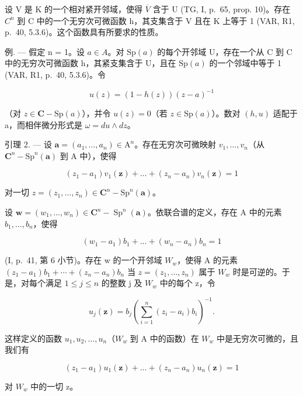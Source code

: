 设 V 是 K 的一个相对紧开邻域，使得 \(\overline{V}\) 含于 U (TG, I, p.~65, prop. 10)。存在 \(C^{n}\) 到 C 中的一个无穷次可微函数 h，其支集含于 V 且在 K 上等于 1 (VAR, R1, p.~40, 5.3.6)。这个函数具有所要求的性质。

例. --- 假定 n = 1。设 \(a \in A\)。对 \(\mathrm{Sp}(a)\) 的每个开邻域 U，存在一个从 C 到 C 中的无穷次可微函数 h，其紧支集含于 U，且在 \(\mathrm{Sp}(a)\) 的一个邻域中等于 1 (VAR, R1, p.~40, 5.3.6)。令

\[
u (z) = (1 - h (z)) (z - a) ^ {- 1}
\]

（对 \(z \in \mathbf{C} - \mathrm{Sp}(a)\)），并令 \(u(z) = 0\)（若 \(z \in \mathrm{Sp}(a)\)）。数对 \((h, u)\) 适配于 a，而相伴微分形式是 \(\omega = du \wedge dz\)。

引理 2. --- 设 \(\boldsymbol{a} = (a_{1},\ldots ,a_{n})\in \mathrm{A}^{n}\)。存在无穷次可微映射 \(v_{1},\ldots ,v_{n}\)（从 \(\mathbf{C}^n -\mathrm{Sp}^n (\boldsymbol {a})\) 到 A 中），使得

\[
(z _ {1} - a _ {1}) v _ {1} (\boldsymbol {z}) + \dots + (z _ {n} - a _ {n}) v _ {n} (\boldsymbol {z}) = 1
\]

对一切 \(z = (z_{1}, \ldots, z_{n}) \in \mathbf{C}^{n} - \mathrm{Sp}^{n}(\boldsymbol{a})\)。

设 \(\boldsymbol{w} = (w_{1}, \ldots, w_{n}) \in \mathbf{C}^{n} - \operatorname{Sp}^{n}(\boldsymbol{a})\)。依联合谱的定义，存在 A 中的元素 \(b_{1}, \ldots, b_{n}\)，使得

\[
(w _ {1} - a _ {1}) b _ {1} + \dots + (w _ {n} - a _ {n}) b _ {n} = 1
\]

(I, p.~41, 第 6 小节)。存在 w 的一个开邻域 \(W_{w}\)，使得 A 的元素 \((z_{1}-a_{1})b_{1}+\cdots+(z_{n}-a_{n})b_{n}\) 当 \(z=(z_{1},\ldots,z_{n})\) 属于 \(W_{w}\) 时是可逆的。于是，对每个满足 \(1\leqslant j\leqslant n\) 的整数 j 及 \(W_{w}\) 中的每个 z，令

\[
u _ {j} (\boldsymbol {z}) = b _ {j} \left(\sum_ {i = 1} ^ {n} (z _ {i} - a _ {i}) b _ {i}\right) ^ {- 1}.
\]

这样定义的函数 \(u_{1}, u_{2}, \ldots, u_{n}\)（\(W_{w}\) 到 A 中的函数）在 \(W_{w}\) 中是无穷次可微的，且我们有

\[
(z _ {1} - a _ {1}) u _ {1} (\boldsymbol {z}) + \dots + (z _ {n} - a _ {n}) u _ {n} (\boldsymbol {z}) = 1
\]

对 \(W_{w}\) 中的一切 z。

